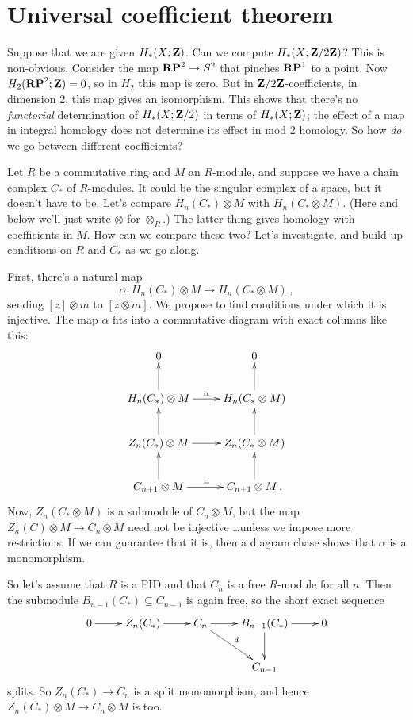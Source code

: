 \section{Universal coefficient theorem}

Suppose that we are given $ H_\ast(X;\mathbf Z)$. Can we compute $ H_\ast(X;\mathbf Z/2\mathbf Z)$? 
This is non-obvious. Consider the map $\mathbf{RP}^2\to S^2$ that pinches $\mathbf{RP}^1$ to a point. Now $H_2(\mathbf{RP}^2;\mathbf Z)=0$, so in $H_2$ this map is zero. But in $\mathbf Z/2\mathbf Z$-coefficients, in dimension $2$, this map gives an isomorphism. This shows that there's no {\em functorial} determination of $ H_\ast(X;\mathbf Z/2)$ in terms of $ H_\ast(X;\mathbf Z)$; the effect of a map in integral homology does not determine its effect in mod 2 homology. So how \emph{do} we go between different coefficients?

Let $R$ be a commutative ring and $M$ an $R$-module, and suppose we have a chain complex $C_\ast$ of $R$-modules. It could be the singular complex of a space, but it doesn't have to be. Let's compare $ H_n(C_\ast)\otimes M$ with $ H_n(C_\ast\otimes M)$. (Here and below we'll just write $\otimes$ for $\otimes_R$.) The latter thing gives homology with coefficients in $M$. How can we compare these two? Let's investigate, and build up conditions on $R$ and $C_\ast$ as we go along. 

First, there's a natural map 
\[
\alpha: H_n(C_\ast)\otimes M\to H_n(C_\ast\otimes M)\,,
\]
sending $[z]\otimes m$ to $[z\otimes m]$.
We propose to find conditions under which it is 
injective. The map $\alpha$ fits into a commutative 
diagram with exact columns like this:
\[
\xymatrix{
0 & 0 \\
H_n(C_*)\otimes M \ar[r]^\alpha \ar[u] & H_n(C_*\otimes M) \ar[u] \\
Z_n(C_*)\otimes M \ar[r] \ar[u] & Z_n(C_*\otimes M) \ar[u] \\
C_{n+1}\otimes M \ar[r]^= \ar[u] & C_{n+1}\otimes M \ar[u] \,.
}\]
Now, $Z_n(C_*\otimes M)$ is a submodule of $C_n\otimes M$, but the map
$Z_n(C)\otimes M\to C_n\otimes M$ need not be injective \ldots unless we impose more
restrictions. If we can guarantee that it is, then a diagram chase shows
that $\alpha$ is a monomorphism. 

So let's assume that $R$ is a PID and that $C_n$ is a free $R$-module for 
all $n$. Then the submodule $B_{n-1}(C_*)\subseteq C_{n-1}$ is again free, 
so the short exact sequence 
\[
\xymatrix{
0 \ar[r] & Z_n(C_*) \ar[r] & C_n \ar[r] \ar[dr]^d & 
B_{n-1}(C_*) \ar[r] \ar[d] & 0 \\
&&& C_{n-1} 
}\]
splits. So $Z_n(C_*)\to C_n$ is a split monomorphism, and hence 
$Z_n(C_*)\otimes M\to C_n\otimes M$ is too. 

